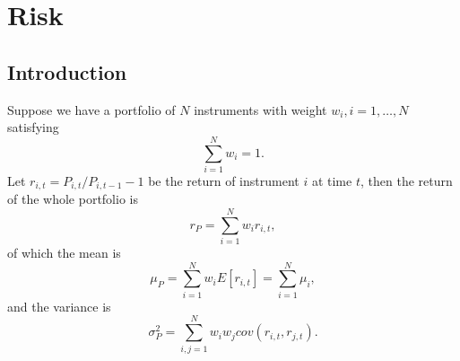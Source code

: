 \chapter{Risk}

\section{Introduction}
Suppose we have a portfolio of $N$ instruments with weight $w_i,i=1,\dots,N$
satisfying
\begin{equation}
  \sum_{i=1}^N w_i = 1.
\end{equation}
Let $r_{i,t}=P_{i,t}/P_{i,t-1}-1$ be the return of instrument $i$ at time $t$,
then the return of the whole portfolio is
\begin{equation}
  r_P = \sum_{i=1}^N w_i r_{i,t},
\end{equation}
of which the mean is
\begin{equation}
  \mu_P = \sum_{i=1}^N w_i E[r_{i,t}] = \sum_{i=1}^N \mu_i,
\end{equation}
and the variance is
\begin{equation}
  \sigma_P^2 = \sum_{i,j=1}^N w_i w_j cov(r_{i,t},r_{j,t}).
\end{equation}

